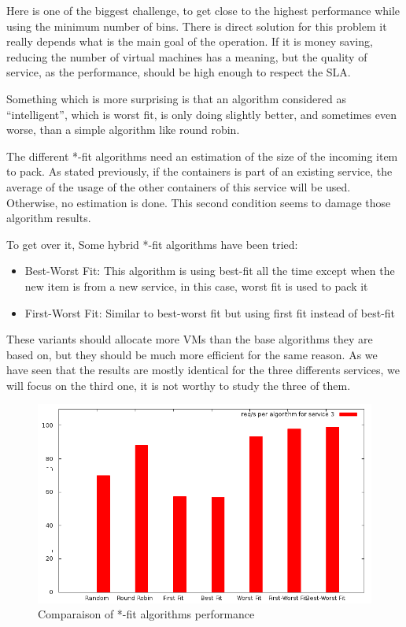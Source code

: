 Here is one of the biggest challenge, to get close to the highest performance
while using the minimum number of bins. There is direct solution for this problem
it really depends what is the main goal of the operation. If it is money saving,
reducing the number of virtual machines has a meaning, but the quality of service,
as the performance, should be high enough to respect the SLA\@.

Something which is more surprising is that an algorithm considered as
``intelligent'', which is worst fit, is only doing slightly better, and
sometimes even worse, than a simple algorithm like round robin.

The different *-fit algorithms need an estimation of the size of the incoming
item to pack. As stated previously, if the containers is part of an existing
service, the average of the usage of the other containers of this service will be
used. Otherwise, no estimation is done. This second condition seems to damage
those algorithm results.

To get over it, Some hybrid *-fit algorithms have been tried:

\begin{itemize}
	\item{Best-Worst Fit: This algorithm is using best-fit all the time except when
	the new item is from a new service, in this case, worst fit is used to pack
	it}
	\item{First-Worst Fit: Similar to best-worst fit but using first fit instead of 
	best-fit}
\end{itemize}

These variants should allocate more VMs than the base algorithms they are based on,
but they should be much more efficient for the same reason. As we have seen that the
results are mostly identical for the three differents services, we will focus on the
third one, it is not worthy to study the three of them.

\begin{figure}[h!]
	\includegraphics[width=\textwidth]{./Images/BinPacking/exp2ext-service3.png}
	\caption{Comparaison of *-fit algorithms performance}
\end{figure}

